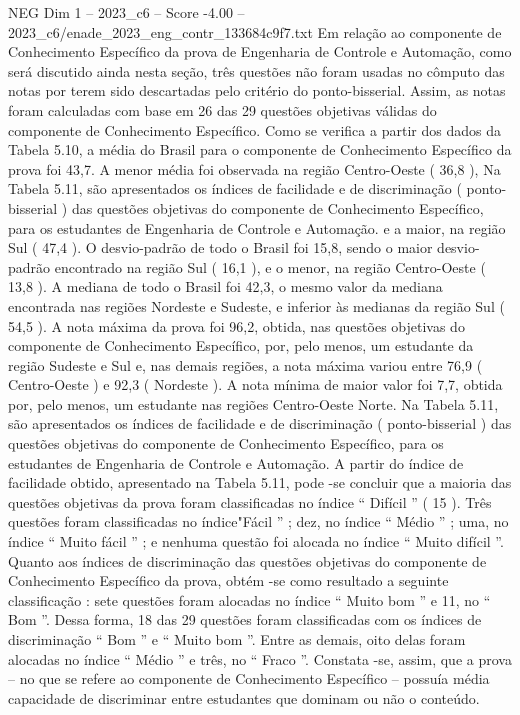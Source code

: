 \begin{textsample}{NEG Dim 1 – 2023\_c6 – Score -4.00 – 2023\_c6/enade\_2023\_eng\_contr\_133684c9f7.txt}
Em relação ao componente de Conhecimento Específico da prova de Engenharia de Controle e Automação, como será discutido ainda nesta seção, três questões não foram usadas no cômputo das notas por terem sido descartadas pelo critério do ponto-bisserial.
Assim, as notas foram calculadas com base em 26 das 29 questões objetivas válidas do componente de Conhecimento Específico.
Como se verifica a partir dos dados da Tabela 5.10, a média do Brasil para o componente de Conhecimento Específico da prova foi 43,7.
A menor média foi observada na região Centro-Oeste ( 36,8 ), Na Tabela 5.11, são apresentados os índices de facilidade e de discriminação ( ponto-bisserial ) das questões objetivas do componente de Conhecimento Específico, para os estudantes de Engenharia de Controle e Automação. e a maior, na região Sul ( 47,4 ).
O desvio-padrão de todo o Brasil foi 15,8, sendo o maior desvio-padrão encontrado na região Sul ( 16,1 ), e o menor, na região Centro-Oeste ( 13,8 ).
A mediana de todo o Brasil foi 42,3, o mesmo valor da mediana encontrada nas regiões Nordeste e Sudeste, e inferior às medianas da região Sul ( 54,5 ).
A nota máxima da prova foi 96,2, obtida, nas questões objetivas do componente de Conhecimento Específico, por, pelo menos, um estudante da região Sudeste e Sul e, nas demais regiões, a nota máxima variou entre 76,9 ( Centro-Oeste ) e 92,3 ( Nordeste ).
A nota mínima de maior valor foi 7,7, obtida por, pelo menos, um estudante nas regiões Centro-Oeste Norte.
Na Tabela 5.11, são apresentados os índices de facilidade e de discriminação ( ponto-bisserial ) das questões objetivas do componente de Conhecimento Específico, para os estudantes de Engenharia de Controle e Automação.
A partir do índice de facilidade obtido, apresentado na Tabela 5.11, pode -se concluir que a maioria das questões objetivas da prova foram classificadas no índice “ Difícil ” ( 15 ).
Três questões foram classificadas no índice"Fácil ” ; dez, no índice “ Médio ” ; uma, no índice “ Muito fácil ” ; e nenhuma questão foi alocada no índice “ Muito difícil ”.
Quanto aos índices de discriminação das questões objetivas do componente de Conhecimento Específico da prova, obtém -se como resultado a seguinte classificação : sete questões foram alocadas no índice “ Muito bom ” e 11, no “ Bom ”.
Dessa forma, 18 das 29 questões foram classificadas com os índices de discriminação “ Bom ” e “ Muito bom ”.
Entre as demais, oito delas foram alocadas no índice “ Médio ” e três, no “ Fraco ”.
Constata -se, assim, que a prova – no que se refere ao componente de Conhecimento Específico – possuía média capacidade de discriminar entre estudantes que dominam ou não o conteúdo.

\end{textsample}
